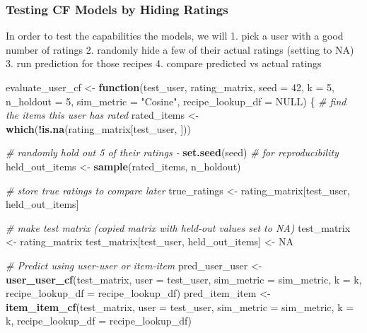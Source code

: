 \documentclass[
]{article}
\newenvironment{Shaded}{\begin{snugshade}}{\end{snugshade}}
\newcommand{\AttributeTok}[1]{\textcolor[rgb]{0.13,0.29,0.53}{#1}}
\newcommand{\CommentTok}[1]{\textcolor[rgb]{0.56,0.35,0.01}{\textit{#1}}}
\newcommand{\ConstantTok}[1]{\textcolor[rgb]{0.56,0.35,0.01}{#1}}
\newcommand{\ControlFlowTok}[1]{\textcolor[rgb]{0.13,0.29,0.53}{\textbf{#1}}}
\newcommand{\DecValTok}[1]{\textcolor[rgb]{0.00,0.00,0.81}{#1}}
\newcommand{\FunctionTok}[1]{\textcolor[rgb]{0.13,0.29,0.53}{\textbf{#1}}}
\newcommand{\NormalTok}[1]{#1}
\newcommand{\OtherTok}[1]{\textcolor[rgb]{0.56,0.35,0.01}{#1}}
\newcommand{\SpecialCharTok}[1]{\textcolor[rgb]{0.81,0.36,0.00}{\textbf{#1}}}
\newcommand{\StringTok}[1]{\textcolor[rgb]{0.31,0.60,0.02}{#1}}
\begin{document}
\subsubsection{Testing CF Models by Hiding
Ratings}\label{testing-cf-models-by-hiding-ratings}

In order to test the capabilities the models, we will 1. pick a user
with a good number of ratings 2. randomly hide a few of their actual
ratings (setting to NA) 3. run prediction for those recipes 4. compare
predicted vs actual ratings

\begin{Shaded}
\begin{Highlighting}[]
\NormalTok{evaluate\_user\_cf }\OtherTok{\textless{}{-}} \ControlFlowTok{function}\NormalTok{(test\_user, rating\_matrix, }\AttributeTok{seed =} \DecValTok{42}\NormalTok{, }\AttributeTok{k =} \DecValTok{5}\NormalTok{, }
                             \AttributeTok{n\_holdout =} \DecValTok{5}\NormalTok{, }\AttributeTok{sim\_metric =} \StringTok{"Cosine"}\NormalTok{, }
                             \AttributeTok{recipe\_lookup\_df =} \ConstantTok{NULL}\NormalTok{) \{}
  \CommentTok{\# find the items this user has rated}
\NormalTok{  rated\_items }\OtherTok{\textless{}{-}} \FunctionTok{which}\NormalTok{(}\SpecialCharTok{!}\FunctionTok{is.na}\NormalTok{(rating\_matrix[test\_user, ]))}
  
  \CommentTok{\# randomly hold out 5 of their ratings {-} }
  \FunctionTok{set.seed}\NormalTok{(seed)  }\CommentTok{\# for reproducibility}
\NormalTok{  held\_out\_items }\OtherTok{\textless{}{-}} \FunctionTok{sample}\NormalTok{(rated\_items, n\_holdout)}
  
  \CommentTok{\# store true ratings to compare later}
\NormalTok{  true\_ratings }\OtherTok{\textless{}{-}}\NormalTok{ rating\_matrix[test\_user, held\_out\_items]}
  
  \CommentTok{\# make test matrix (copied matrix with held{-}out values set to NA)}
\NormalTok{  test\_matrix }\OtherTok{\textless{}{-}}\NormalTok{ rating\_matrix}
\NormalTok{  test\_matrix[test\_user, held\_out\_items] }\OtherTok{\textless{}{-}} \ConstantTok{NA}
  
  \CommentTok{\# Predict using user{-}user or item{-}item}
\NormalTok{  pred\_user\_user }\OtherTok{\textless{}{-}} \FunctionTok{user\_user\_cf}\NormalTok{(test\_matrix, }\AttributeTok{user =}\NormalTok{ test\_user, }
                                 \AttributeTok{sim\_metric =}\NormalTok{ sim\_metric, }\AttributeTok{k =}\NormalTok{ k, }
                                 \AttributeTok{recipe\_lookup\_df =}\NormalTok{ recipe\_lookup\_df)}
\NormalTok{  pred\_item\_item }\OtherTok{\textless{}{-}} \FunctionTok{item\_item\_cf}\NormalTok{(test\_matrix, }\AttributeTok{user =}\NormalTok{ test\_user, }
                                 \AttributeTok{sim\_metric =}\NormalTok{ sim\_metric, }\AttributeTok{k =}\NormalTok{ k,}
                                 \AttributeTok{recipe\_lookup\_df =}\NormalTok{ recipe\_lookup\_df)}
  

\end{Highlighting}
\end{Shaded}
\end{document}
